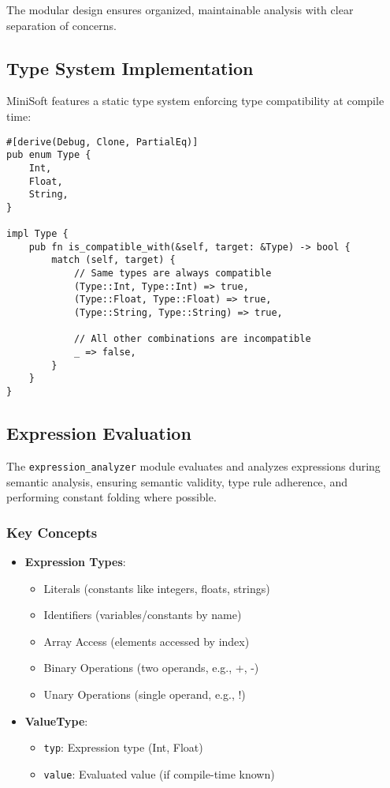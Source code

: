 \documentclass[12pt,a4paper]{article}
\begin{document}
The modular design ensures organized, maintainable analysis with clear separation of concerns.

\subsection{Type System Implementation}
MiniSoft features a static type system enforcing type compatibility at compile time:

\begin{lstlisting}[caption={Type System}]
#[derive(Debug, Clone, PartialEq)]
pub enum Type {
    Int,
    Float,
    String,
}

impl Type {
    pub fn is_compatible_with(&self, target: &Type) -> bool {
        match (self, target) {
            // Same types are always compatible
            (Type::Int, Type::Int) => true,
            (Type::Float, Type::Float) => true,
            (Type::String, Type::String) => true,
            
            // All other combinations are incompatible
            _ => false,
        }
    }
}
\end{lstlisting}

\subsection{Expression Evaluation}
The \texttt{expression\_analyzer} module evaluates and analyzes expressions during semantic analysis, ensuring semantic validity, type rule adherence, and performing constant folding where possible.

\subsubsection*{Key Concepts}
\begin{itemize}
	\item \textbf{Expression Types}:
	      \begin{itemize}
		      \item Literals (constants like integers, floats, strings)
		      \item Identifiers (variables/constants by name)
		      \item Array Access (elements accessed by index)
		      \item Binary Operations (two operands, e.g., +, -)
		      \item Unary Operations (single operand, e.g., !)
	      \end{itemize}

	\item \textbf{ValueType}:
	      \begin{itemize}
		      \item \texttt{typ}: Expression type (Int, Float)
		      \item \texttt{value}: Evaluated value (if compile-time known)
	      \end{itemize}
\end{itemize}
\end{document}
